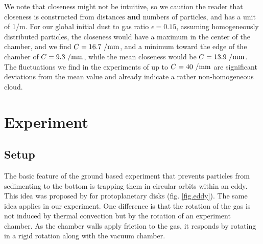 We note that closeness might not be intuitive, so we caution the reader that closeness is constructed from distances \textbf{and} numbers of particles, and has a unit of 1/m. 
For our global initial dust to gas ratio $\epsilon =0.15$, assuming homogeneously distributed particles, the closeness would have a maximum in the center of the chamber, and we find $C = 16.7~\rm /mm$, and a minimum toward the edge of the chamber of $C =  9.3~\rm /mm$, while the mean closeness would be $C = 13.9~\rm /mm$.  The fluctuations we find in the experiments of up to $C = 40~\rm/mm$ are significant deviations from the mean value and already indicate a rather non-homogeneous cloud.




\section{Experiment}
\subsection{Setup}

The basic feature of the ground based experiment that prevents particles from sedimenting to the bottom is trapping them in circular orbits within an eddy. This idea was proposed by \citet{klahr1997} for protoplanetary disks (fig. \ref{fig.eddy}). The same idea applies in our experiment. {One difference is that the rotation of the gas is not
induced by thermal convection but by the rotation of an experiment chamber.} As the chamber walls apply friction to the gas, it
responds by rotating in a rigid rotation along with the vacuum chamber. 

